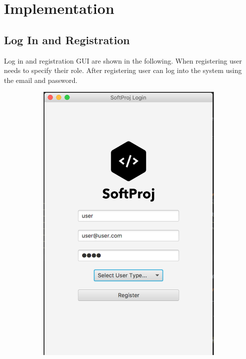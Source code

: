 %
\chapter{Implementation}
\label{sec:concepts}

\section{Log In and Registration}
Log in and registration GUI are shown in the following. When registering user needs to specify their role. After registering user can log into the system using the email and password.

\begin{figure}[h]
\centering
\begin{subfigure}{.5\textwidth}
  \centering
  \includegraphics[width=.6\linewidth]{content/1.png}
  \caption{}
  \label{fig:sub1}
\end{subfigure}%
\begin{subfigure}{.5\textwidth}
  \centering

\end{subfigure}
\end{figure}
